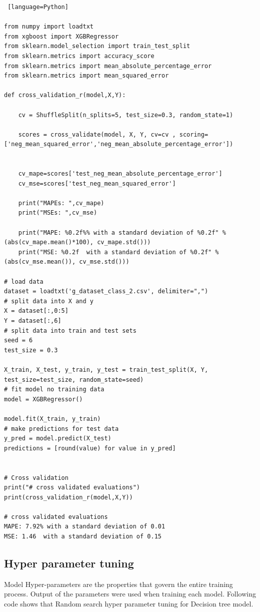 \begin{lstlisting} [language=Python]

from numpy import loadtxt
from xgboost import XGBRegressor
from sklearn.model_selection import train_test_split
from sklearn.metrics import accuracy_score
from sklearn.metrics import mean_absolute_percentage_error
from sklearn.metrics import mean_squared_error

def cross_validation_r(model,X,Y):

	cv = ShuffleSplit(n_splits=5, test_size=0.3, random_state=1)
	
	scores = cross_validate(model, X, Y, cv=cv , scoring=['neg_mean_squared_error','neg_mean_absolute_percentage_error'])
	
	
	cv_mape=scores['test_neg_mean_absolute_percentage_error']
	cv_mse=scores['test_neg_mean_squared_error']
	
	print("MAPEs: ",cv_mape)
	print("MSEs: ",cv_mse)
	
	print("MAPE: %0.2f%% with a standard deviation of %0.2f" % (abs(cv_mape.mean()*100), cv_mape.std()))
	print("MSE: %0.2f  with a standard deviation of %0.2f" % (abs(cv_mse.mean()), cv_mse.std()))
	
# load data
dataset = loadtxt('g_dataset_class_2.csv', delimiter=",")
# split data into X and y
X = dataset[:,0:5]
Y = dataset[:,6]
# split data into train and test sets
seed = 6
test_size = 0.3

X_train, X_test, y_train, y_test = train_test_split(X, Y, test_size=test_size, random_state=seed)
# fit model no training data
model = XGBRegressor()

model.fit(X_train, y_train)
# make predictions for test data
y_pred = model.predict(X_test)
predictions = [round(value) for value in y_pred]


# Cross validation
print("# cross validated evaluations")
print(cross_validation_r(model,X,Y))

# cross validated evaluations
MAPE: 7.92% with a standard deviation of 0.01
MSE: 1.46  with a standard deviation of 0.15

\end{lstlisting}


\subsection{Hyper parameter tuning}

Model Hyper-parameters are the properties that govern the entire training process. Output of the parameters were used when training each model. Following code shows that Random search hyper parameter tuning for Decision tree model.

